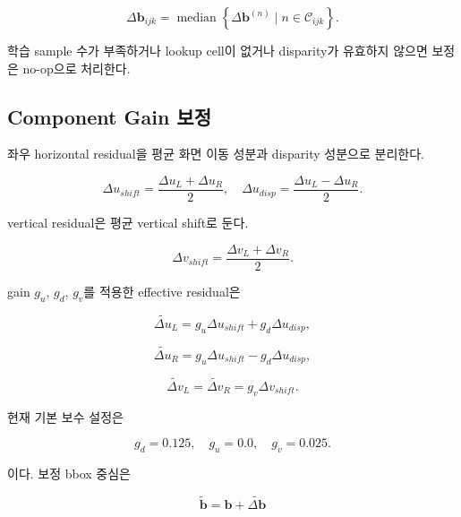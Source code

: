 \documentclass[10pt,conference]{IEEEtran}
\newcommand{\vect}[1]{\bm{#1}}
\begin{document}
\begin{equation}
\Delta\vect{b}_{ijk}
=
\operatorname{median}
\left\{
\Delta\vect{b}^{(n)}
\mid
n\in\mathcal{C}_{ijk}
\right\}.
\label{eq:cell_median}
\end{equation}

학습 sample 수가 부족하거나 lookup cell이 없거나 disparity가 유효하지 않으면 보정은 no-op으로 처리한다.

\subsection{Component Gain 보정}

좌우 horizontal residual을 평균 화면 이동 성분과 disparity 성분으로 분리한다.

\begin{equation}
\Delta u_{shift}
=
\frac{\Delta u_L+\Delta u_R}{2},
\quad
\Delta u_{disp}
=
\frac{\Delta u_L-\Delta u_R}{2}.
\end{equation}

vertical residual은 평균 vertical shift로 둔다.

\begin{equation}
\Delta v_{shift}
=
\frac{\Delta v_L+\Delta v_R}{2}.
\end{equation}

gain $g_u$, $g_d$, $g_v$를 적용한 effective residual은

\begin{equation}
\tilde{\Delta u}_L
=
g_u\Delta u_{shift}
+
g_d\Delta u_{disp},
\end{equation}

\begin{equation}
\tilde{\Delta u}_R
=
g_u\Delta u_{shift}
-
g_d\Delta u_{disp},
\end{equation}

\begin{equation}
\tilde{\Delta v}_L
=
\tilde{\Delta v}_R
=
g_v\Delta v_{shift}.
\end{equation}

현재 기본 보수 설정은

\begin{equation}
g_d=0.125,
\quad
g_u=0.0,
\quad
g_v=0.025.
\label{eq:default_gains}
\end{equation}

이다.
보정 bbox 중심은

\begin{equation}
\tilde{\vect{b}}
=
\vect{b}
+
\tilde{\Delta\vect{b}}
\end{equation}
\end{document}
